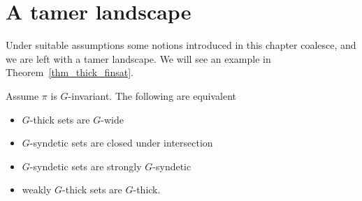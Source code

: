 \section{A tamer landscape}\label{tame_landscape}

Under suitable assumptions some notions introduced in this chapter coalesce, and we are left with a tamer landscape.
We will see an example in Theorem~\ref{thm_thick_finsat}.

\begin{theorem}\label{thm_coalesce}
  Assume $\pi$ is $G$-invariant.
  The following are equivalent\nobreak
  \begin{itemize}
    \item[1.] $G$-thick sets are $G$-wide
    \item[2.] $G$-syndetic sets are closed under intersection 
    \item[3.] $G$-syndetic sets are strongly $G$-syndetic
    \item[4.] weakly $G$-thick sets are $G$-thick.
  \end{itemize}
\end{theorem}

